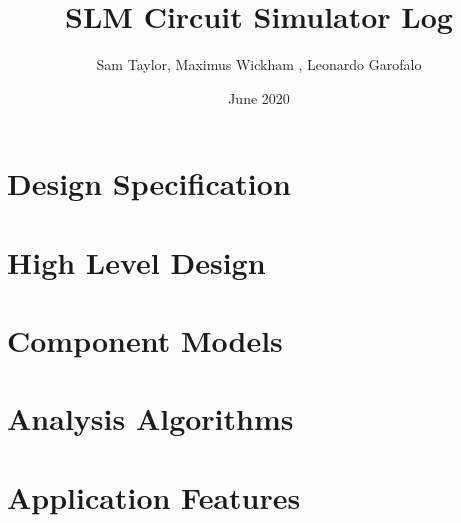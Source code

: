 \documentclass{article}
\title{SLM Circuit Simulator Log}
\author{Sam Taylor, Maximus Wickham , Leonardo Garofalo}
\date{June 2020}
\begin{document}
\maketitle
\tableofcontents

\newpage
\section{Design Specification}

\newpage

\section{High Level Design}

\newpage

\section{Component Models}

\newpage

\section{Analysis Algorithms}

\newpage

\section{Application Features}

\newpage
\end{document}
